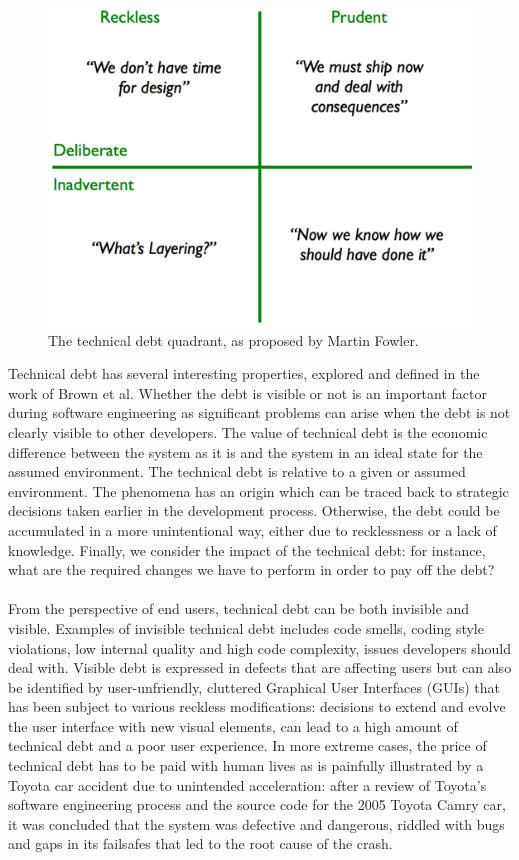 \begin{figure}[!h]
	\centering
	\includegraphics[width=0.5\columnwidth]{images/introduction/technical_debt_quadrant}
	\caption{The technical debt quadrant, as proposed by Martin Fowler.}
	\label{fig:technical-debt-quadrant}
\end{figure}

Technical debt has several interesting properties, explored and defined in the work of Brown et al\cite{brown2010managing}. 
Whether the debt is visible or not is an important factor during software engineering as significant problems can arise when the debt is not clearly visible to other developers.
The value of technical debt is the economic difference between the system as it is and the system in an ideal state for the assumed environment.
The technical debt is relative to a given or assumed environment.
The phenomena has an origin which can be traced back to strategic decisions taken earlier in the development process. Otherwise, the debt could be accumulated in a more unintentional way, either due to recklessness or a lack of knowledge.
Finally, we consider the impact of the technical debt: for instance, what are the required changes we have to perform in order to pay off the debt?\\\\
From the perspective of end users, technical debt can be both invisible and visible\cite{kruchten2012technical}.
Examples of invisible technical debt includes code smells, coding style violations, low internal quality and high code complexity, issues developers should deal with.
Visible debt is expressed in defects that are affecting users but can also be identified by user-unfriendly, cluttered Graphical User Interfaces (GUIs) that has been subject to various reckless modifications: decisions to extend and evolve the user interface with new visual elements, can lead to a high amount of technical debt and a poor user experience.
In more extreme cases, the price of technical debt has to be paid with human lives as is painfully illustrated by a Toyota car accident due to unintended acceleration: after a review of Toyota’s software engineering process and the source code for the 2005 Toyota Camry car, it was concluded that the system was defective and dangerous, riddled with bugs and gaps in its failsafes that led to the root cause of the crash\cite{toyotatechnicaldebt}.\\\\
